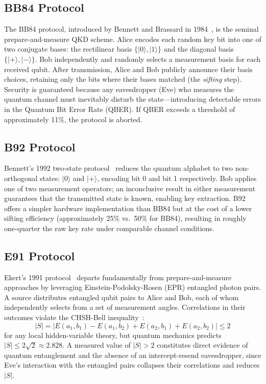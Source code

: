 \documentclass[journal]{IEEEtran}
\begin{document}
\subsection{BB84 Protocol}

The BB84 protocol, introduced by Bennett and Brassard in
1984~\cite{bb84}, is the seminal prepare-and-measure QKD scheme.
Alice encodes each random key bit into one of two conjugate bases:
the rectilinear basis $\{|0\rangle, |1\rangle\}$ and the diagonal
basis $\{|+\rangle, |-\rangle\}$. Bob independently and randomly
selects a measurement basis for each received qubit. After transmission,
Alice and Bob publicly announce their basis choices, retaining only
the bits where their bases matched (the \emph{sifting} step). Security
is guaranteed because any eavesdropper (Eve) who measures the quantum
channel must inevitably disturb the state—introducing detectable errors
in the Quantum Bit Error Rate (QBER). If QBER exceeds a threshold of
approximately 11\%, the protocol is aborted.

\subsection{B92 Protocol}

Bennett's 1992 two-state protocol~\cite{b92} reduces the quantum
alphabet to two non-orthogonal states: $|0\rangle$ and $|+\rangle$,
encoding bit 0 and bit 1 respectively. Bob applies one of two
measurement operators; an inconclusive result in either measurement
guarantees that the transmitted state is known, enabling key
extraction. B92 offers a simpler hardware implementation than BB84 but
at the cost of a lower sifting efficiency (approximately 25\% vs.\ 50\%
for BB84), resulting in roughly one-quarter the raw key rate under
comparable channel conditions.

\subsection{E91 Protocol}

Ekert's 1991 protocol~\cite{e91} departs fundamentally from
prepare-and-measure approaches by leveraging Einstein-Podolsky-Rosen
(EPR) entangled photon pairs. A source distributes entangled qubit
pairs to Alice and Bob, each of whom independently selects from a set
of measurement angles. Correlations in their outcomes violate the
CHSH-Bell inequality~\cite{clauser1969}:
\begin{equation}
  |S| = |E(a_1,b_1) - E(a_1,b_2) + E(a_2,b_1) + E(a_2,b_2)| \leq 2
  \label{eq:bell_classical}
\end{equation}
for any local hidden-variable theory, but quantum mechanics predicts
$|S| \leq 2\sqrt{2} \approx 2.828$. A measured value of $|S| > 2$
constitutes direct evidence of quantum entanglement and the absence
of an intercept-resend eavesdropper, since Eve's interaction with the
entangled pairs collapses their correlations and reduces $|S|$.
\end{document}
